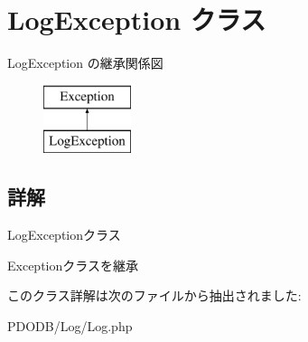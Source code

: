 \hypertarget{class_log_exception}{\section{Log\+Exception クラス}
\label{class_log_exception}
}
Log\+Exception の継承関係図\begin{figure}[H]
\begin{center}
\leavevmode
\includegraphics[height=2.000000cm]{class_log_exception}
\end{center}
\end{figure}


\subsection{詳解}
Log\+Exceptionクラス

Exceptionクラスを継承 

このクラス詳解は次のファイルから抽出されました\+:\begin{DoxyCompactItemize}
\item 
P\+D\+O\+D\+B/\+Log/Log.\+php\end{DoxyCompactItemize}

